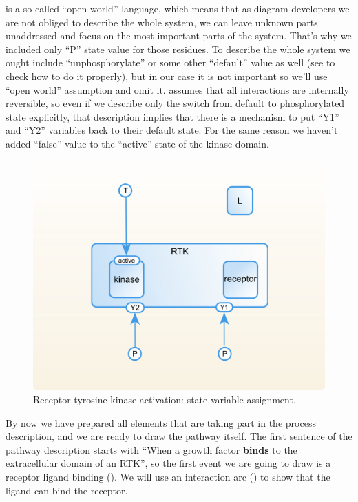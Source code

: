 \SBGNERLone is a so called ``open world'' language, which means that as diagram developers we are not obliged to describe the whole system, we can leave unknown parts unaddressed and focus on the most important parts of the system. That's why we included only ``P'' state value for those residues. To describe the whole system we ought include ``unphosphorylate'' or some other ``default'' value as well (see  to check how to do it properly), but in our case it is not important so we'll use ``open world'' assumption and omit it.  \SBGNERLone assumes that all interactions are internally reversible, so even if we describe only the switch from default to phosphorylated state explicitly, that description implies that there is a mechanism to put ``Y1'' and ``Y2'' variables back to their default state. For the same reason we haven't added ``false'' value to the ``active'' state of the kinase domain.
 
\begin{figure}[H]
  \centering
  \vspace*{-0.75em}
  \includegraphics[scale=0.75]{examples/rtk-states.png}
   \caption{Receptor tyrosine kinase activation: state variable assignment.}
  \label{fig:rtk-states}
\end{figure}

By now we have prepared all elements that are taking part in the process description, and we are ready to draw the pathway itself. The first sentence of the pathway description starts with ``When a growth factor \textbf{binds} to the extracellular domain of an RTK'', so the first event we are going to draw is a receptor ligand binding (). We will use an interaction arc () to show that the ligand can bind the receptor.

